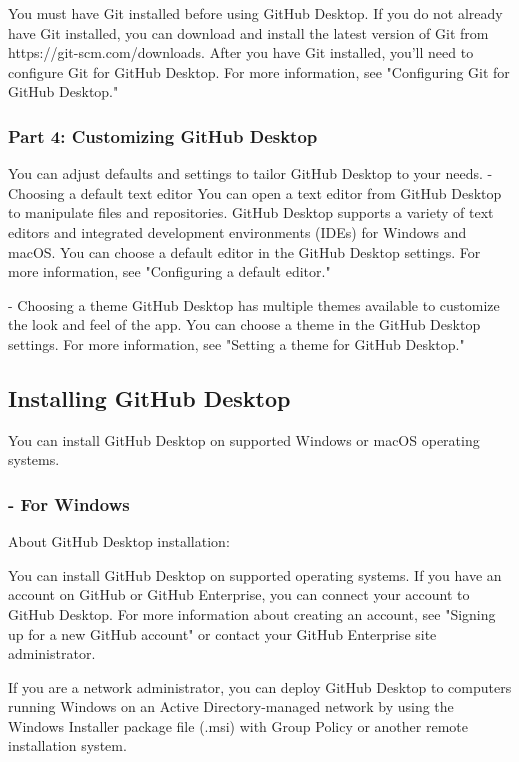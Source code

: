 You must have Git installed before using GitHub Desktop. If you do not already have Git installed, you can download and install the latest version of Git from https://git-scm.com/downloads.
After you have Git installed, you'll need to configure Git for GitHub Desktop. For more information, see "Configuring Git for GitHub Desktop."

\subsubsection{Part 4: Customizing GitHub Desktop }
You can adjust defaults and settings to tailor GitHub Desktop to your needs.
- Choosing a default text editor
You can open a text editor from GitHub Desktop to manipulate files and repositories. GitHub Desktop supports a variety of text editors and integrated development environments (IDEs) for Windows and macOS. You can choose a default editor in the GitHub Desktop settings. For more information, see "Configuring a default editor."

- Choosing a theme
GitHub Desktop has multiple themes available to customize the look and feel of the app. You can choose a theme in the GitHub Desktop settings. For more information, see "Setting a theme for GitHub Desktop."





\subsection{Installing GitHub Desktop }

You can install GitHub Desktop on supported Windows or macOS operating systems.

\subsubsection{- For Windows }

About GitHub Desktop installation: 

You can install GitHub Desktop on supported operating systems. If you have an account on GitHub or GitHub Enterprise, you can connect your account to GitHub Desktop. For more information about creating an account, see "Signing up for a new GitHub account" or contact your GitHub Enterprise site administrator.

If you are a network administrator, you can deploy GitHub Desktop to computers running Windows on an Active Directory-managed network by using the Windows Installer package file (.msi) with Group Policy or another remote installation system.

